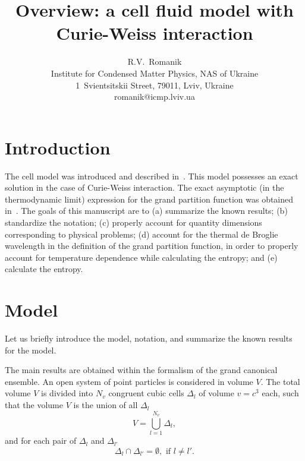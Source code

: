 \documentclass[12pt]{article}
\title{Overview: a cell fluid model with Curie-Weiss interaction}
\author{R.V.~Romanik
	\\ \small Institute for Condensed Matter Physics, NAS of Ukraine
	\\ \small 1~Svientsitskii Street, 79011, Lviv, Ukraine
	\\ \small romanik@icmp.lviv.ua}
\numberwithin{equation}{section}
\begin{document}
	\allowdisplaybreaks
	
	\maketitle
	
	
	
	\tableofcontents
	
	\section{Introduction}
	The cell model was introduced and described in~\cite{KKD18,KKD20}. This model possesses an exact solution in the case of Curie-Weiss interaction. The exact asymptotic (in the thermodynamic limit) expression for the grand partition function was obtained in~\cite{KKD20}.
	The goals of this manuscript are to (a) summarize the known results; (b) standardize the notation; (c) properly account for quantity dimensions corresponding to physical problems; (d) account for the thermal de Broglie wavelength in the definition of the grand partition function, in order to properly account for temperature dependence while calculating the entropy; and (e) calculate the entropy.
	
	\section{\label{sec:model} Model}
	Let us briefly introduce the model, notation, and summarize the known results for the model.
	
	The main results are obtained within the formalism of the grand canonical ensemble. An open system of point particles is considered in volume $V$. The total volume $V$ is divided into $N_v$ congruent cubic cells $\Delta_l$ of volume $v=c^3$ each, such that the volume $V$ is the union of all $\Delta_l$
	\begin{equation*}
		V = \bigcup_{l=1}^{N_v}\Delta_l,
	\end{equation*}
	and for each pair of $\Delta_l$ and $\Delta_{l'}$
	\begin{equation*}
		\Delta_l \cap \Delta_{l'} = \emptyset, \text{ if } l \neq l'.
	\end{equation*}
	
\end{document}
